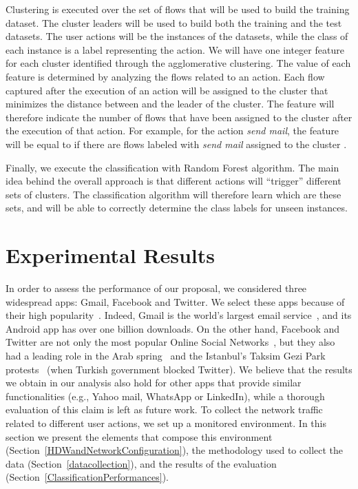 \documentclass{acm_proc_article-sp}
\newcommand{\hilight}[1]{#1}
\begin{document}
Clustering is executed over the set of flows that will be used to build the training dataset. 
\hilight{The cluster leaders will be used to build both the training and the test datasets. The user 
actions will be the instances of the datasets, while the class of each instance is a label representing 
the action. We will have one integer feature for 
each cluster identified through the agglomerative clustering. The value of
each feature is determined 
by analyzing the flows related to an action.}
Each flow  captured after the execution of an action will 
be assigned to the cluster that 
minimizes the distance between  and the leader of the cluster.
The  feature 
will therefore indicate the number of flows that have been 
assigned to the cluster  after the execution of that action.
For example, for the 
action \emph{send mail}, the  feature will be equal to  
if there are  flows labeled with \emph{send mail}
assigned to the cluster .

Finally, we execute the classification with Random Forest algorithm. 
The main idea behind the overall approach is that different actions will ``trigger'' different
sets of clusters. The classification algorithm will therefore learn which are these sets, 
and will be able to correctly determine the class labels for unseen instances. 





\section{Experimental Results}
\label{ExperimentalResults}


In order to assess the performance of our proposal, we considered three widespread apps: Gmail, Facebook and Twitter. 
\hilight{We select these apps because of their high popularity}~\cite{androidRank}.
\hilight{Indeed, Gmail is the world's largest email service}~\cite{gmailbeatshotmail},
\hilight{and its Android app has over one billion downloads.}
\hilight{On the other hand, Facebook and Twitter are not only the most popular Online Social Networks}~\cite{ebizmbaRank},
\hilight{but they also had a leading role in the Arab spring}~\cite{fbtwarabstring}
\hilight{and the Istanbul's Taksim Gezi Park protests}~\cite{fbtwturkey2}
\hilight{(when Turkish government blocked Twitter)}.
\hilight{We believe that the results we obtain in our analysis also hold for other apps that provide similar functionalities (e.g., Yahoo mail, WhatsApp or LinkedIn), while a thorough evaluation of this claim is left as future work. }To collect the network traffic related to different user actions, we set up a \hilight{monitored environment.} 
In this section we present the elements that compose this environment (Section~\ref{HDWandNetworkConfiguration}), 
the methodology used to collect the data (Section~\ref{datacollection}), and the results of the evaluation (Section~\ref{ClassificationPerformances}). 
\end{document}
